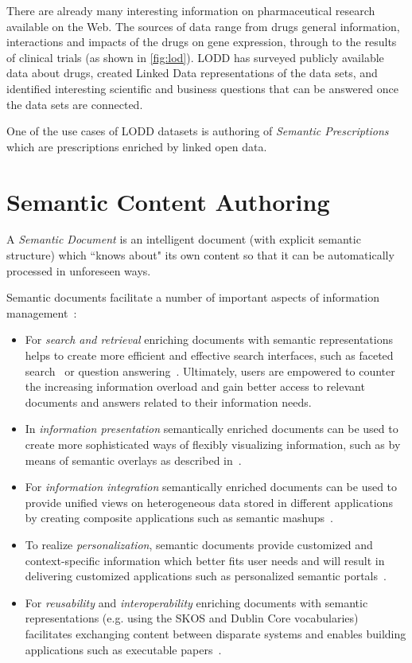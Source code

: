 \documentclass[10pt, conference, compsocconf]{IEEEtran}
\begin{document}
There are already many interesting information on pharmaceutical research available on the Web.
The sources of data range from drugs general information, interactions and impacts of the drugs on gene expression, through to the results of clinical trials (as shown in \autoref{fig:lod}).
LODD\cite{lodrug} has surveyed publicly available data about drugs, created Linked Data representations of the data sets, and identified interesting scientific and business questions that can be answered once the data sets are connected.

One of the use cases of LODD datasets is authoring of \emph{Semantic Prescriptions} which are prescriptions enriched by linked open data.

\section{Semantic Content Authoring}
\label{sec:sca}
 A \emph{Semantic Document} is an intelligent document (with explicit semantic structure) which ``knows about" its own content so that it can be automatically processed in unforeseen ways.

Semantic documents facilitate a number of important aspects of information management~\cite{rdface}:
\begin{itemize}
	\item For \emph{search and retrieval} enriching documents with semantic representations helps to create more efficient and effective search interfaces, such as faceted search~\cite{tunkenlang2009faceted} or question answering~\cite{Lopez2011}.
		Ultimately, users are empowered to counter the increasing information overload and gain better access to relevant documents and answers related to their information needs.
	\item In \emph{information presentation} semantically enriched documents can be used to create more sophisticated ways of flexibly visualizing information, such as by means of semantic overlays as described in~\cite{Burel2009}.
	\item For \emph{information integration} semantically enriched documents can be used to provide unified views on heterogeneous data stored in different applications by creating composite applications such as semantic mashups~\cite{Ankolekar2007}.
	\item To realize \emph{personalization}, semantic documents provide customized and context-specific information which better fits user needs and will
result in delivering customized applications such as personalized semantic portals~\cite{ecs2007}.
	\item For \emph{reusability} and \emph{interoperability} enriching documents with semantic representations (e.g. using the SKOS and Dublin Core vocabularies) facilitates exchanging content between disparate systems and enables building applications such as executable papers~\cite{Muller2011}. \\
\end{itemize}
\end{document}
